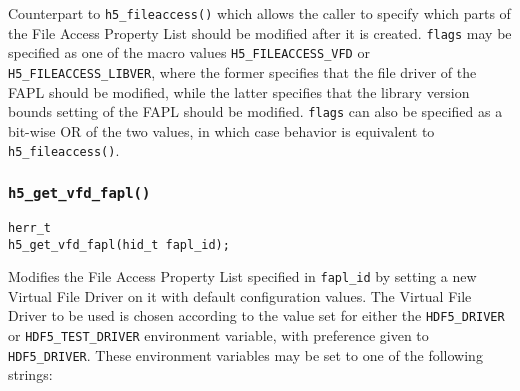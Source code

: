 \documentclass[../HDF5_RFC.tex]{subfiles}
\begin{document}
Counterpart to \texttt{h5\_fileaccess()} which allows the caller to specify which parts of the File
Access Property List should be modified after it is created. \texttt{flags} may be specified as one of
the macro values \texttt{H5\_FILEACCESS\_VFD} or \texttt{H5\_FILEACCESS\_LIBVER}, where the former
specifies that the file driver of the FAPL should be modified, while the latter specifies that the
library version bounds setting of the FAPL should be modified. \texttt{flags} can also be specified
as a bit-wise OR of the two values, in which case behavior is equivalent to \texttt{h5\_fileaccess()}.

\subsubsection{\texttt{h5\_get\_vfd\_fapl()}}

\begin{verbatim}
herr_t
h5_get_vfd_fapl(hid_t fapl_id);
\end{verbatim}

Modifies the File Access Property List specified in \texttt{fapl\_id} by setting a new Virtual File Driver
on it with default configuration values. The Virtual File Driver to be used is chosen according to the
value set for either the \texttt{HDF5\_DRIVER} or \texttt{HDF5\_TEST\_DRIVER} environment variable, with
preference given to \texttt{HDF5\_DRIVER}. These environment variables may be set to one of the following
strings:
\end{document}
